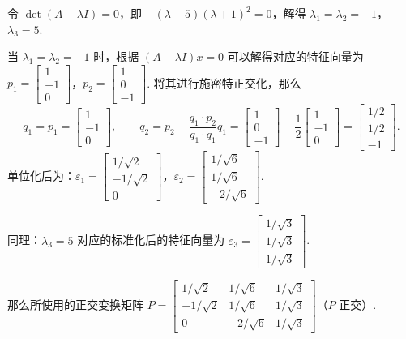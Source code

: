 \documentclass[a4paper,11pt]{ctexart}
\begin{document}
令 $\det(A - \lambda I) = 0$，即 $-(\lambda - 5)(\lambda + 1)^2 = 0$，解得 $\lambda_1 = \lambda_2 = -1$，$\lambda_3 = 5$.

当 $\lambda_1 = \lambda_2 = -1$ 时，根据 $(A - \lambda I)x = 0$ 可以解得对应的特征向量为 $p_1 = \begin{bmatrix} 1 \\ -1 \\ 0 \end{bmatrix}$，$p_2 = \begin{bmatrix} 1 \\ 0 \\ -1 \end{bmatrix}$. 将其进行施密特正交化，那么
\[
  q_1 = p_1 = \begin{bmatrix} 1 \\ -1 \\ 0 \end{bmatrix},\qquad
  q_2 = p_2 - \frac{q_1 \cdot p_2}{q_1 \cdot q_1} q_1 = \begin{bmatrix} 1 \\ 0 \\ -1 \end{bmatrix} - \frac{1}{2}\begin{bmatrix} 1 \\ -1 \\ 0 \end{bmatrix} = \begin{bmatrix} 1/2 \\ 1/2 \\ -1 \end{bmatrix}.
\]
单位化后为：$\varepsilon_1 = \begin{bmatrix} 1/\sqrt{2} \\ -1/\sqrt{2} \\ 0 \end{bmatrix}$，$\varepsilon_2 = \begin{bmatrix} 1/\sqrt{6} \\ 1/\sqrt{6} \\ -2/\sqrt{6} \end{bmatrix}$.

同理：$\lambda_3 = 5$ 对应的标准化后的特征向量为 $\varepsilon_3 = \begin{bmatrix} 1/\sqrt{3} \\ 1/\sqrt{3} \\ 1/\sqrt{3} \end{bmatrix}$.

那么所使用的正交变换矩阵 $P = \begin{bmatrix} 1/\sqrt{2} & 1/\sqrt{6} & 1/\sqrt{3} \\ -1/\sqrt{2} & 1/\sqrt{6} & 1/\sqrt{3} \\ 0 & -2/\sqrt{6} & 1/\sqrt{3} \end{bmatrix}$（$P$ 正交）.
\end{document}
